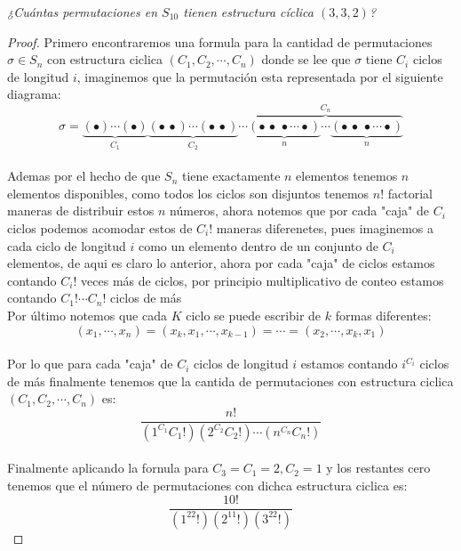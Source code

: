\documentclass[11pt,letterpaper]{article}
\begin{document}
\begin{tcolorbox}[
	title = \textcolor{black}{\textcolor{white}{Problema 8}},]
\textit{¿Cu\'antas permutaciones en $S_{10}$ tienen estructura c\'iclica $(3,3,2)$?
}
\end{tcolorbox}
\begin{proof}
    Primero encontraremos una formula para la cantidad de permutaciones $\sigma\in S_n$ con estructura ciclica $(C_1,C_2,\cdots,C_n)$ donde se lee que $\sigma$ tiene $C_i$ ciclos de longitud $i$, imaginemos que la permutaci\'on esta representada por el siguiente diagrama:
    \begin{equation*}
        \sigma=\underbrace{(\bullet)\cdots(\bullet)}_{C_1}\underbrace{(\bullet\,\bullet)\cdots(\bullet\,\bullet)}_{C_2}\cdots\overbrace{\underbrace{(\bullet\,\bullet\,\bullet\cdots\bullet)}_{n}\cdots\underbrace{(\bullet\,\bullet\,\bullet\cdots\bullet)}_{n}}^{C_n}
    \end{equation*}\,\\
    Ademas por el hecho de que $S_n$ tiene exactamente $n$ elementos tenemos $n$ elementos disponibles, como todos los ciclos son disjuntos tenemos $n!$ factorial maneras de distribuir estos $n$ n\'umeros, ahora notemos que por cada "caja" de $C_i$ ciclos podemos acomodar estos de $C_i!$ maneras diferenetes, pues imaginemos a cada ciclo de longitud $i$ como un elemento dentro de un conjunto de $C_i$ elementos, de aqui es claro lo anterior, ahora por cada
    "caja" de ciclos estamos contando $C_i!$ veces m\'as de ciclos, por principio multiplicativo de conteo estamos contando $C_1!\cdots C_n!$ ciclos de m\'as\,\\
    Por \'ultimo notemos que cada $K$ ciclo se puede escribir de $k$ formas diferentes:
    \begin{equation*}
        (x_1,\cdots,x_n)=(x_k,x_1,\cdots,x_{k-1})=\cdots=(x_2,\cdots,x_k,x_1)
    \end{equation*}\,\\
    Por lo que para cada "caja" de $C_i$ ciclos de longitud $i$ estamos contando $i^{C_i}$ ciclos de m\'as finalmente tenemos que la cantida de permutaciones con estructura ciclica $(C_1,C_2,\cdots,C_n)$ es:
    \begin{equation*}
        \frac{n!}{(1^{C_1}C_1!)(2^{C_2}C_2!)\cdots (n^{C_n}C_n!)}
    \end{equation*}\,\\
    Finalmente aplicando la fornula para $C_3=C_1=2, C_2=1$ y los restantes cero tenemos que el n\'umero de permutaciones con dichca estructura ciclica es:
    \begin{equation*}
        \frac{10!}{(1^22!)(2^11!)(3^22!)}
    \end{equation*}
\end{proof}
\end{document}
